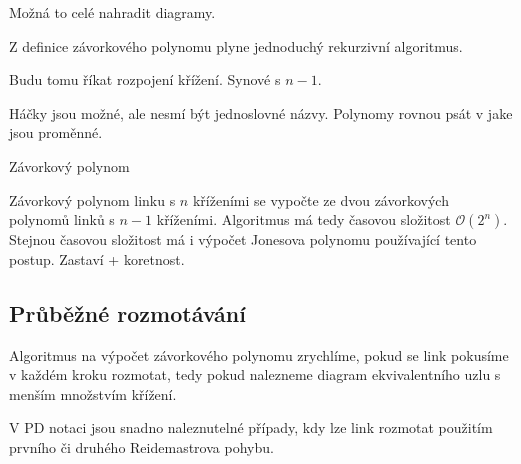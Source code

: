 Možná to celé nahradit diagramy.

Z definice závorkového polynomu plyne jednoduchý rekurzivní algoritmus.

Budu tomu říkat rozpojení křížení. Synové s $n-1$.

Háčky jsou možné, ale nesmí být jednoslovné názvy.
Polynomy rovnou psát v jake jsou proměnné.

\begin{algorithm}[H]

\DontPrintSemicolon

%




\caption{Závorkový polynom} 
\end{algorithm}

Závorkový polynom linku s $n$ kříženími se vypočte ze dvou závorkových polynomů linků s $n-1$ kříženími. Algoritmus má tedy časovou složitost $\mathcal{O}(2^n)$. Stejnou časovou složitost má i výpočet Jonesova polynomu používající tento postup.
Zastaví + koretnost.


\subsection{Průběžné rozmotávání}
Algoritmus na výpočet závorkového polynomu zrychlíme, pokud se link pokusíme v každém kroku rozmotat, tedy pokud nalezneme diagram ekvivalentního uzlu s menším množstvím křížení. 

V PD notaci jsou snadno naleznutelné případy, kdy lze link rozmotat použitím prvního či druhého Reidemastrova pohybu.

